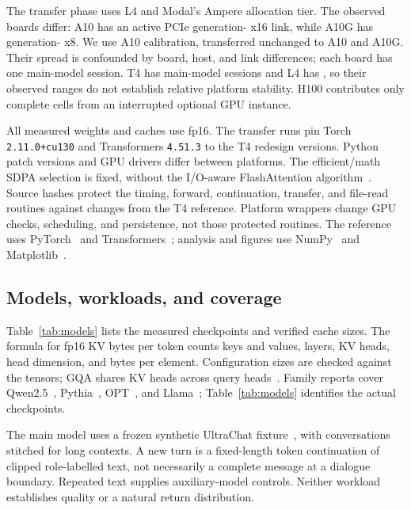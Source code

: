 \documentclass[10pt]{article}
\begin{document}
The transfer phase uses L4 and Modal's Ampere allocation tier. The observed boards differ: A10 has an active PCIe generation- x16 link, while A10G has generation- x8. We use A10 calibration, transferred unchanged to A10 and A10G. Their spread is confounded by board, host, and link differences; each board has one main-model session. T4 has  main-model sessions and L4 has , so their observed ranges do not establish relative platform stability. H100 contributes only complete cells from an interrupted optional GPU instance.

All measured weights and caches use fp16. The transfer runs pin Torch \texttt{2.11.0+cu130} and Transformers \texttt{4.51.3} to the T4 redesign versions. Python patch versions and GPU drivers differ between platforms. The efficient/math SDPA selection is fixed, without the I/O-aware FlashAttention algorithm~\citep{flashattention}. Source hashes protect the timing, forward, continuation, transfer, and file-read routines against changes from the T4 reference. Platform wrappers change GPU checks, scheduling, and persistence, not those protected routines. The reference uses PyTorch~\citep{pytorch} and Transformers~\citep{transformers}; analysis and figures use NumPy~\citep{numpy} and Matplotlib~\citep{matplotlib}.

\subsection{Models, workloads, and coverage}
Table~\ref{tab:models} lists the measured checkpoints and verified cache sizes. The formula for fp16 KV bytes per token counts keys and values, layers, KV heads, head dimension, and bytes per element. Configuration sizes are checked against the tensors; GQA shares KV heads across query heads~\citep{gqa}. Family reports cover Qwen2.5~\citep{qwen}, Pythia~\citep{pythia}, OPT~\citep{opt}, and Llama~\citep{llama}; Table~\ref{tab:models} identifies the actual checkpoints.
\begin{table}[t]
\centering\small

\caption{Released fp16 models and verified KV payload. The Llama checkpoint is the ungated mirror. These are different models, not a controlled attention-layout intervention.}\label{tab:models}
\end{table}

The main model uses a frozen synthetic UltraChat fixture~\citep{ultrachat}, with conversations stitched for long contexts. A new turn is a fixed-length token continuation of clipped role-labelled text, not necessarily a complete message at a dialogue boundary. Repeated text supplies auxiliary-model controls. Neither workload establishes quality or a natural return distribution.
\end{document}
